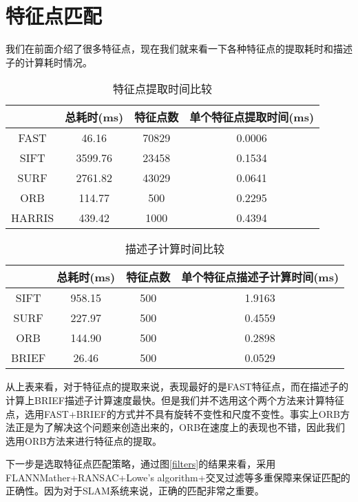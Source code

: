 \section{特征点匹配}
我们在前面介绍了很多特征点，现在我们就来看一下各种特征点的提取耗时和描述子的计算耗时情况。
\begin{table}[htbp]
	\centering
	\caption{特征点提取时间比较}
	\begin{tabular}{cccc}
		\toprule
		& 总耗时(ms) & 特征点数  & 单个特征点提取时间(ms) \\ \hline
		FAST   & 46.16   & 70829 & 0.0006        \\ \hline
		SIFT   & 3599.76 & 23458 & 0.1534        \\ \hline
		SURF   & 2761.82 & 43029 & 0.0641        \\ \hline
		ORB    & 114.77  & 500   & 0.2295        \\ \hline
		HARRIS & 439.42  & 1000  & 0.4394      	\\ \bottomrule
	\end{tabular}
\end{table}\par

\begin{table}[]
	\centering
	\caption{描述子计算时间比较}
	\begin{tabular}{cccc}
		\toprule
		& 总耗时(ms) & 特征点数 & 单个特征点描述子计算时间(ms) \\ \hline
		SIFT  & 958.15  & 500  & 1.9163           \\ \hline
		SURF  & 227.97  & 500  & 0.4559           \\ \hline
		ORB   & 144.90  & 500  & 0.2898           \\ \hline
		BRIEF & 26.46   & 500  & 0.0529          \\ \bottomrule
	\end{tabular}
\end{table}
从上表来看，对于特征点的提取来说，表现最好的是FAST特征点，而在描述子的计算上BRIEF描述子计算速度最快。但是我们并不选用这个两个方法来计算特征点，选用FAST+BRIEF的方式并不具有旋转不变性和尺度不变性。事实上ORB方法正是为了解决这个问题来创造出来的，ORB在速度上的表现也不错，因此我们选用ORB方法来进行特征点的提取。\par
下一步是选取特征点匹配策略，通过图\ref{filters}的结果来看，采用FLANNMather+RANSAC+Lowe's algorithm+交叉过滤等多重保障来保证匹配的正确性。因为对于SLAM系统来说，正确的匹配非常之重要。

